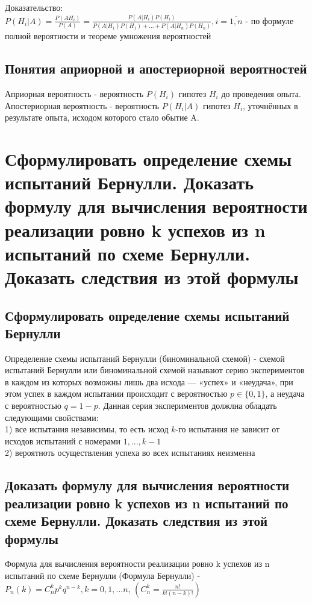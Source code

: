 Доказательство:\\
$P(H_{i}|A) = \frac{P(A H_{i})}{P(A)} = \frac{P(A|H_{i})P(H_{i})}{P(A|H_{1})P(H_{1}) + ... + P(A|H_{n})P(H_{n})}, i = \overline{1, n}$ - по формуле полной вероятности и теореме умножения вероятностей\\

\subsection{Понятия априорной и апостериорной вероятностей}
Априорная вероятность - вероятность $P(H_{i})$ гипотез $H_{i}$ до проведения опыта.\\
Апостериорная вероятность - вероятность $P(H_{i}|A)$ гипотез $H_{i}$, уточнённых в результате опыта, исходом которого стало обытие A.\\

\section{Сформулировать определение схемы испытаний Бернулли. Доказать формулу для вычисления вероятности реализации ровно k успехов из n испытаний по схеме Бернулли. Доказать следствия из этой формулы}

\subsection{Сформулировать определение схемы испытаний Бернулли}

Определение схемы испытаний Бернулли (биноминальной схемой) - схемой испытаний Бернулли или биноминальной схемой называют серию экспериментов в каждом из которых возможны лишь два исхода — «успех» и «неудача», при этом успех в каждом испытании происходит с вероятностью $p \in \{0, 1\}$, а неудача с вероятностью $q = 1 - p$. Данная серия экспериментов должлна обладать следующими свойствами:\\
1) все испытания независимы, то есть исход $k$-го испытания не зависит от исходов испытаний с номерами $1, ..., k-1$\\
2) вероятноть осуществления успеха во всех испытаниях неизменна\\

\subsection{Доказать формулу для вычисления вероятности реализации ровно k успехов из n испытаний по схеме Бернулли. Доказать следствия из этой формулы}
Формула для вычисления вероятности реализации ровно k успехов из n испытаний по схеме Бернулли (Формула Бернулли) - $P_{n}(k) = C^{k}_{n} p^{k} q^{n - k}, k = 0, 1, ... n$, $(C^{k}_{n} = \frac{n!}{k! (n - k)!})$\\

